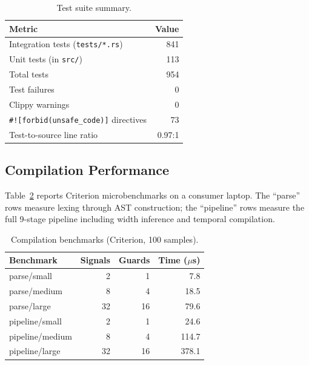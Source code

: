 \documentclass[conference]{IEEEtran}
\begin{document}
\begin{table}[t]
\centering
\footnotesize
\caption{Test suite summary.}
\label{tab:test-summary}
\begin{tabular}{@{}lr@{}}
\toprule
\textbf{Metric} & \textbf{Value} \\
\midrule
Integration tests (\texttt{tests/*.rs})      & 841 \\
Unit tests (in \texttt{src/})                 & 113 \\
Total tests                                   & 954 \\
Test failures                                 & 0 \\
Clippy warnings                               & 0 \\
\texttt{\#![forbid(unsafe\_code)]} directives & 73 \\
Test-to-source line ratio                     & 0.97:1 \\
\bottomrule
\end{tabular}
\end{table}

\subsection{Compilation Performance}

Table~\ref{tab:benchmarks} reports Criterion microbenchmarks on a
consumer laptop.  The ``parse'' rows measure lexing through AST
construction; the ``pipeline'' rows measure the full 9-stage pipeline
including width inference and temporal compilation.

\begin{table}[t]
\centering
\footnotesize
\caption{Compilation benchmarks (Criterion, 100 samples).}
\label{tab:benchmarks}
\begin{tabular}{@{}lrrr@{}}
\toprule
\textbf{Benchmark} & \textbf{Signals} & \textbf{Guards} & \textbf{Time ($\mu$s)} \\
\midrule
parse/small     &  2 &  1 &   7.8 \\
parse/medium    &  8 &  4 &  18.5 \\
parse/large     & 32 & 16 &  79.6 \\
\midrule
pipeline/small  &  2 &  1 &  24.6 \\
pipeline/medium &  8 &  4 & 114.7 \\
pipeline/large  & 32 & 16 & 378.1 \\
\bottomrule
\end{tabular}
\end{table}
\end{document}
